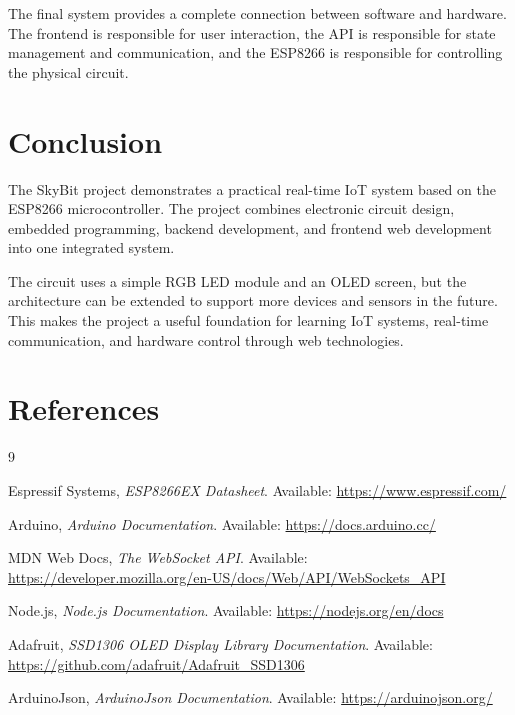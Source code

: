 \documentclass[12pt,a4paper]{report}
\begin{document}
The final system provides a complete connection between software and hardware. The frontend is responsible for user interaction, the API is responsible for state management and communication, and the ESP8266 is responsible for controlling the physical circuit.

\chapter{Conclusion}

The SkyBit project demonstrates a practical real-time IoT system based on the ESP8266 microcontroller. The project combines electronic circuit design, embedded programming, backend development, and frontend web development into one integrated system.

The circuit uses a simple RGB LED module and an OLED screen, but the architecture can be extended to support more devices and sensors in the future. This makes the project a useful foundation for learning IoT systems, real-time communication, and hardware control through web technologies.

\chapter{References}

\begin{thebibliography}{9}

Espressif Systems, \textit{ESP8266EX Datasheet}.  
Available: \url{https://www.espressif.com/}

Arduino, \textit{Arduino Documentation}.  
Available: \url{https://docs.arduino.cc/}

MDN Web Docs, \textit{The WebSocket API}.  
Available: \url{https://developer.mozilla.org/en-US/docs/Web/API/WebSockets_API}

Node.js, \textit{Node.js Documentation}.  
Available: \url{https://nodejs.org/en/docs}

Adafruit, \textit{SSD1306 OLED Display Library Documentation}.  
Available: \url{https://github.com/adafruit/Adafruit_SSD1306}

ArduinoJson, \textit{ArduinoJson Documentation}.  
Available: \url{https://arduinojson.org/}

\end{thebibliography}
\end{document}
